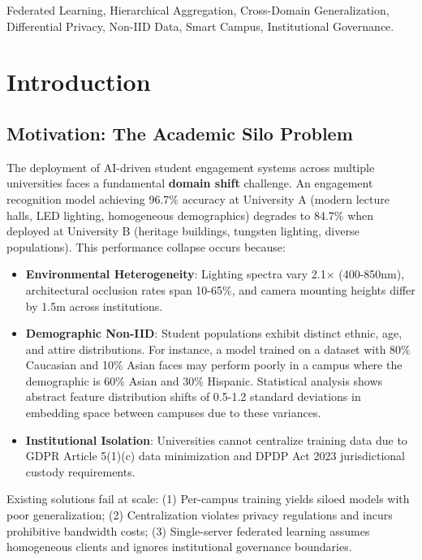 \documentclass[conference]{IEEEtran}
\begin{document}
\begin{IEEEkeywords}
Federated Learning, Hierarchical Aggregation, Cross-Domain Generalization, Differential Privacy, Non-IID Data, Smart Campus, Institutional Governance.
\end{IEEEkeywords}

\section{Introduction}

\subsection{Motivation: The Academic Silo Problem}

The deployment of AI-driven student engagement systems across multiple universities faces a fundamental \textbf{domain shift} challenge. An engagement recognition model achieving 96.7\% accuracy at University A (modern lecture halls, LED lighting, homogeneous demographics) degrades to 84.7\% when deployed at University B (heritage buildings, tungsten lighting, diverse populations). This performance collapse occurs because:

\begin{itemize}
    \item \textbf{Environmental Heterogeneity}: Lighting spectra vary 2.1$\times$ (400-850nm), architectural occlusion rates span 10-65\%, and camera mounting heights differ by 1.5m across institutions.
    \item \textbf{Demographic Non-IID}: Student populations exhibit distinct ethnic, age, and attire distributions. For instance, a model trained on a dataset with 80\% Caucasian and 10\% Asian faces may perform poorly in a campus where the demographic is 60\% Asian and 30\% Hispanic. Statistical analysis shows abstract feature distribution shifts of 0.5-1.2 standard deviations in embedding space between campuses due to these variances.
    \item \textbf{Institutional Isolation}: Universities cannot centralize training data due to GDPR Article 5(1)(c) data minimization and DPDP Act 2023 jurisdictional custody requirements.
\end{itemize}

Existing solutions fail at scale: (1) Per-campus training yields siloed models with poor generalization; (2) Centralization violates privacy regulations and incurs prohibitive bandwidth costs; (3) Single-server federated learning assumes homogeneous clients and ignores institutional governance boundaries.
\end{document}
